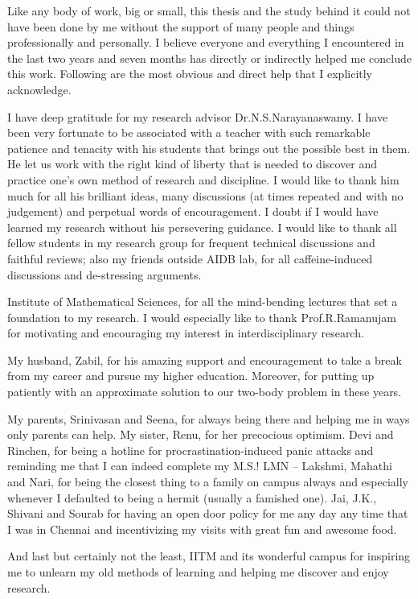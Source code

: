 \xclearpage
\acknowledgements

Like any body of work, big or small, this thesis and the study behind
it could not have been done by me without the support of many people
and things professionally and personally. I believe everyone and
everything I encountered in the last two years and seven months has directly or
indirectly helped me conclude this work. Following are the most
obvious and direct help that I explicitly acknowledge.

I have deep gratitude for my research advisor
Dr.\;N.\;S.\;Narayanaswamy. I have been very fortunate to be
associated with a teacher with such remarkable patience and tenacity
with his students that brings out the possible best in them. He let us
work with the right kind of liberty that is needed to discover and
practice one's own method of research and discipline.  I would like to
thank him much for all his brilliant ideas, many discussions (at times
repeated and with no judgement) and perpetual words of
encouragement. I doubt if I would have learned my research without his
persevering guidance.  I would like to thank all fellow students in my
research group for frequent technical discussions and faithful
reviews; also my friends outside AIDB lab, for all caffeine-induced
discussions and de-stressing arguments.

Institute of Mathematical Sciences, for all the mind-bending lectures
that set a foundation to my research. I would especially like to thank
Prof.\;R.\;Ramanujam for motivating and encouraging my interest in
interdisciplinary research.

My husband, Zabil, for his amazing support and encouragement to take a
break from my career and pursue my higher education. Moreover, for
putting up patiently with an approximate solution to our two-body
problem in these years.

My parents, Srinivasan and Seena, for always being there and helping
me in ways only parents can help. My sister, Renu, for her precocious optimism. Devi and Rinchen, for being a
hotline for procrastination-induced panic attacks and reminding me
that I can indeed complete my M.\;S.\;! LMN -- Lakshmi, Mahathi and
Nari, for being the closest thing to a family on campus always and
especially whenever I defaulted to being a hermit (usually a famished
one).  Jai, J.\;K.\;, Shivani and Sourab for having an open door
policy for me any day any time that I was in Chennai and incentivizing
my visits with great fun and awesome food.


And last but certainly not the least, IITM and its wonderful campus
for inspiring me to unlearn my old methods of learning and helping me
discover and enjoy research.

